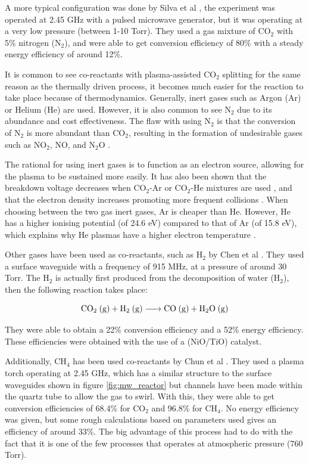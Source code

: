 A more typical configuration was done by Silva et al \cite{Silva2014}, the experiment was operated at 2.45 GHz with a pulsed microwave generator, but it was operating at a very low pressure (between 1-10 Torr). They used a gas mixture of CO$_2$ with 5\% nitrogen (N$_2$), and were able to get conversion efficiency of 80\% with a steady energy efficiency of around 12\%. 

It is common to see co-reactants with plasma-assisted CO$_2$ splitting for the same reason as the thermally driven process, it becomes much easier for the reaction to take place because of thermodynamics. Generally, inert gases such as Argon (Ar) or Helium (He) are used. However, it is also common to see N$_2$ due to its abundance and cost effectiveness. The flaw with using N$_2$ is that the conversion of N$_2$ is more abundant than CO$_2$, resulting in the formation of undesirable gases such as NO$_2$, NO, and N$_2$O \cite{Qin2018}.  

The rational for using inert gases is to function as an electron source, allowing for the plasma to be sustained more easily. It has also been shown that the breakdown voltage decreases when CO$_2$-Ar or CO$_2$-He mixtures are used \cite{Ramakers2015}, and that the electron density increases promoting more frequent collisions \cite{Qin2018, Ramakers2015}. When choosing between the two gas inert gases, Ar is cheaper than He. However, He has a higher ionising potential (of 24.6 eV) compared to that of Ar (of 15.8 eV), which explains why He plasmas have a higher electron temperature \cite{Qin2018, Jeroen_Jonkers_2003}.

Other gases have been used as co-reactants, such as H$_2$ by Chen et al \cite{chen2017role}. They used a surface waveguide with a frequency of 915 MHz, at a pressure of around 30 Torr. The H$_2$ is actually first produced from the decomposition of water (H$_2$), then the following reaction takes place:

\begin{equation}
    \ce{CO$_2$ (g) + H$_2$ (g) -> CO (g) + H$_2$O (g)}
\end{equation} 

They were able to obtain a 22\% conversion efficiency and a 52\% energy efficiency. These efficiencies were obtained with the use of a (NiO/TiO) catalyst.

Additionally, CH$_4$ has been used co-reactants by Chun et al \cite{Chun2017}. They used a plasma torch operating at 2.45 GHz, which has a similar structure to the surface waveguides shown in figure \ref{fig:mw_reactor} but channels have been made within the quartz tube to allow the gas to swirl. With this, they were able to get conversion efficiencies of 68.4\% for CO$_2$ and 96.8\% for CH$_4$. No energy efficiency was given, but some rough calculations based on parameters used gives an efficiency of around 33\%. The big advantage of this process had to do with the fact that it is one of the few processes that operates at atmospheric pressure (760 Torr).


